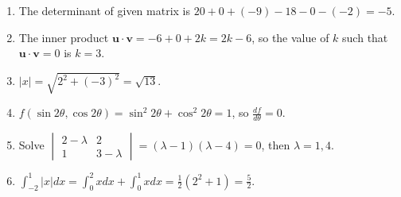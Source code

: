 \documentclass{article}
\begin{document}
\begin{enumerate}
  \item 
    The determinant of given matrix is $
      20 + 0 + (-9) - 18 - 0 - (-2) = -5
    $.

  \item
    The inner product $\mathbf{u} \cdot \mathbf{v} = -6 + 0 + 2k = 2k - 6$,
    so the value of $k$ such that $\mathbf{u} \cdot \mathbf{v} = 0$ is $k = 3$.

  \item
    $|x| = \sqrt{2^2 + (-3)^2} = \sqrt{13}$. 

  \item
    $f(\sin 2\theta, \cos 2\theta) = \sin^2 2\theta + \cos^2 2\theta = 1$,
    so $\frac{df}{d\theta} = 0$.

  \item 
    Solve $\begin{vmatrix} 2 - \lambda & 2 \\ 1 & 3 - \lambda \end{vmatrix}
    = (\lambda - 1)(\lambda - 4) = 0$, 
    then $\lambda = 1, 4$.

  \item
    $\int_{-2}^{1} |x| dx = \int_{0}^{2} x dx + \int_{0}^{1} x dx = \frac{1}{2} (2^2 + 1) =  \frac{5}{2}$.

  \end{enumerate}
 
\end{document}
